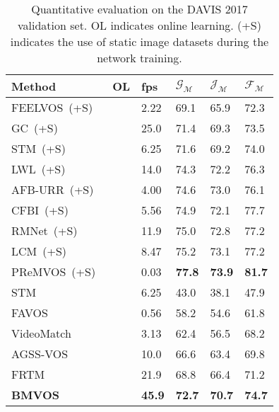 \documentclass[10pt,twocolumn,letterpaper]{article}
\begin{document}
	
	
	\begin{table}
		\centering 
		\caption{Quantitative evaluation on the DAVIS 2017 validation set. OL indicates online learning. (+S) indicates the use of static image datasets during the network training.}
		\vspace{2mm}
		\small
		\begin{tabular}{lP{0.58cm}P{0.58cm}P{0.58cm}P{0.58cm}P{0.58cm}}
			\toprule
			Method &OL &fps &$\mathcal{G}_\mathcal{M}$ &$\mathcal{J}_\mathcal{M}$ &$\mathcal{F}_\mathcal{M}$\\
			\midrule
			FEELVOS~(+S)~\cite{FEELVOS} & &2.22 &69.1 &65.9 &72.3\\
			GC~(+S)~\cite{GC} & &25.0 &71.4 &69.3 &73.5\\
			STM~(+S)~\cite{STM} & &6.25 &71.6 &69.2 &74.0\\
			LWL~(+S)~\cite{LWL} &\checkmark &14.0 &74.3 &72.2 &76.3\\
			AFB-URR~(+S)~\cite{AFB-URR} & &4.00 &74.6 &73.0 &76.1\\
			CFBI~(+S)~\cite{CFBI} & &5.56 &74.9 &72.1 &77.7\\
			RMNet~(+S)~\cite{RMNet} & &11.9 &75.0 &72.8 &77.2\\
			LCM~(+S)~\cite{LCM} & &8.47 &75.2 &73.1 &77.2\\
			PReMVOS~(+S)~\cite{PReMVOS} &\checkmark &0.03 &\textbf{77.8} &\textbf{73.9} &\textbf{81.7}\\
			\midrule
			STM~\cite{STM} & &6.25 &43.0 &38.1 &47.9\\
			FAVOS~\cite{FAVOS} & &0.56 &58.2 &54.6 &61.8\\
			VideoMatch~\cite{VideoMatch} & &3.13 &62.4 &56.5 &68.2\\
			AGSS-VOS~\cite{AGSS-VOS} & &10.0 &66.6 &63.4 &69.8\\
			FRTM~\cite{FRTM} &\checkmark &21.9 &68.8 &66.4 &71.2\\
			\midrule
			\textbf{BMVOS} & &\textbf{45.9} &\textbf{72.7} &\textbf{70.7} &\textbf{74.7}\\
			\bottomrule
		\end{tabular}
		\label{Table:DAVIS17_val}
	\end{table}
	
\end{document}

